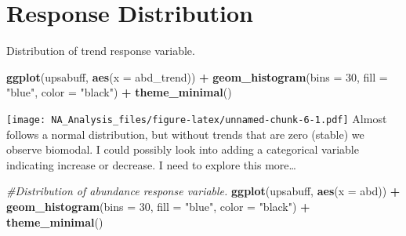 \documentclass[
]{article}
\newenvironment{Shaded}{\begin{snugshade}}{\end{snugshade}}
\newcommand{\AttributeTok}[1]{\textcolor[rgb]{0.13,0.29,0.53}{#1}}
\newcommand{\CommentTok}[1]{\textcolor[rgb]{0.56,0.35,0.01}{\textit{#1}}}
\newcommand{\DecValTok}[1]{\textcolor[rgb]{0.00,0.00,0.81}{#1}}
\newcommand{\FunctionTok}[1]{\textcolor[rgb]{0.13,0.29,0.53}{\textbf{#1}}}
\newcommand{\NormalTok}[1]{#1}
\newcommand{\OtherTok}[1]{\textcolor[rgb]{0.56,0.35,0.01}{#1}}
\newcommand{\SpecialCharTok}[1]{\textcolor[rgb]{0.81,0.36,0.00}{\textbf{#1}}}
\newcommand{\StringTok}[1]{\textcolor[rgb]{0.31,0.60,0.02}{#1}}
\begin{document}
\section{Response Distribution}\label{response-distribution}

Distribution of trend response variable.

\begin{Shaded}
\begin{Highlighting}[]
\FunctionTok{ggplot}\NormalTok{(upsabuff, }\FunctionTok{aes}\NormalTok{(}\AttributeTok{x =}\NormalTok{ abd\_trend)) }\SpecialCharTok{+}
  \FunctionTok{geom\_histogram}\NormalTok{(}\AttributeTok{bins =} \DecValTok{30}\NormalTok{, }\AttributeTok{fill =} \StringTok{"blue"}\NormalTok{, }\AttributeTok{color =} \StringTok{"black"}\NormalTok{) }\SpecialCharTok{+}
  \FunctionTok{theme\_minimal}\NormalTok{()}
\end{Highlighting}
\end{Shaded}

\texttt{[image: NA\_Analysis\_files/figure-latex/unnamed-chunk-6-1.pdf]}
Almost follows a normal distribution, but without trends that are zero
(stable) we observe biomodal. I could possibly look into adding a
categorical variable indicating increase or decrease. I need to explore
this more\ldots{}

\begin{Shaded}
\end{Shaded}

\begin{Shaded}
\begin{Highlighting}[]
\CommentTok{\#Distribution of abundance response variable. }
\FunctionTok{ggplot}\NormalTok{(upsabuff, }\FunctionTok{aes}\NormalTok{(}\AttributeTok{x =}\NormalTok{ abd)) }\SpecialCharTok{+}
  \FunctionTok{geom\_histogram}\NormalTok{(}\AttributeTok{bins =} \DecValTok{30}\NormalTok{, }\AttributeTok{fill =} \StringTok{"blue"}\NormalTok{, }\AttributeTok{color =} \StringTok{"black"}\NormalTok{) }\SpecialCharTok{+}
  \FunctionTok{theme\_minimal}\NormalTok{()}
\end{Highlighting}
\end{Shaded}
\end{document}
